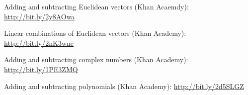 \begin{readinessAssuranceResources}
\item Adding and subtracting Euclidean vectors (Khan Acaemdy):
      \url{http://bit.ly/2y8AOwa}
\item Linear combinations of Euclidean vectors (Khan Academy):
      \url{http://bit.ly/2nK3wne}
\item Adding and subtracting complex numbers (Khan Academy):
      \url{http://bit.ly/1PE3ZMQ}
\item Adding and subtracting polynomials (Khan Academy):
      \url{http://bit.ly/2d5SLGZ}
\end{readinessAssuranceResources}
